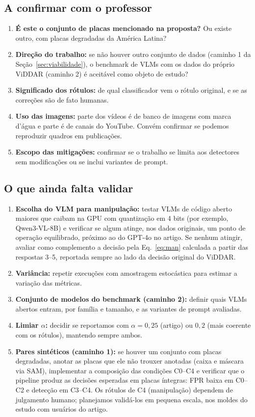 \documentclass[journal,onecolumn]{IEEEtran}
\begin{document}
\subsection{A confirmar com o professor}
\begin{enumerate}
\item \textbf{É este o conjunto de placas mencionado na proposta?} Ou existe outro, com placas
  degradadas da América Latina?
\item \textbf{Direção do trabalho:} se não houver outro conjunto de dados (caminho 1 da
  Seção~\ref{sec:viabilidade}), o benchmark de VLMs com os dados do próprio ViDDAR (caminho 2) é
  aceitável como objeto de estudo?
\item \textbf{Significado dos rótulos:} de qual classificador vem o rótulo original, e se as
  correções são de fato humanas.
\item \textbf{Uso das imagens:} parte dos vídeos é de banco de imagens com marca d'água e parte é de
  canais do YouTube. Convém confirmar se podemos reproduzir quadros em publicações.
\item \textbf{Escopo das mitigações:} confirmar se o trabalho se limita aos detectores sem
  modificações ou se inclui variantes de prompt.
\end{enumerate}

\subsection{O que ainda falta validar}
\begin{enumerate}
\item \textbf{Escolha do VLM para manipulação:} testar VLMs de código aberto maiores que caibam na GPU
  com quantização em 4 bits (por exemplo, Qwen3-VL-8B) e verificar se algum atinge, nos dados
  originais, um ponto de operação equilibrado, próximo ao do GPT-4o no artigo. Se nenhum atingir,
  avaliar como complemento a decisão pela Eq.~\eqref{eq:man} calculada a partir das respostas 3--5,
  reportada sempre ao lado da decisão original do ViDDAR.
\item \textbf{Variância:} repetir execuções com amostragem estocástica para estimar a variação das
  métricas.
\item \textbf{Conjunto de modelos do benchmark (caminho 2):} definir quais VLMs abertos entram, por
  família e tamanho, e as variantes de prompt avaliadas.
\item \textbf{Limiar $\alpha$:} decidir se reportamos com $\alpha=0{,}25$ (artigo) ou $0{,}2$ (mais
  coerente com os rótulos), mantendo sempre ambos.
\item \textbf{Pares sintéticos (caminho 1):} se houver um conjunto com placas degradadas, anotar as
  placas que ele não trouxer anotadas (caixa e máscara via SAM), implementar a composição das condições
  C0--C4 e verificar que o pipeline produz as decisões esperadas em placas íntegras: FPR baixa em C0--C2
  e detecção em C3--C4. Os rótulos de C4 (manipulação) dependem de julgamento humano; planejamos
  validá-los em pequena escala, nos moldes do estudo com usuários do artigo.
\end{enumerate}
\end{document}
